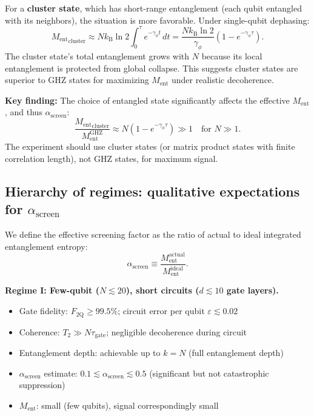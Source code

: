 \documentclass[12pt,letterpaper]{article}
\theoremstyle{plain}
\theoremstyle{definition}
\theoremstyle{remark}
\newcommand{\kB}{k_{\mathrm{B}}}
\newcommand{\Ment}{M_{\mathrm{ent}}}
\newcommand{\asc}{\alpha_{\mathrm{screen}}}
\begin{document}
For a \textbf{cluster state}, which has short-range entanglement (each qubit entangled with
its neighbors), the situation is more favorable.  Under single-qubit dephasing:
\begin{equation}
  {\Ment}_{\mathrm{cluster}}
  \approx N\kB\ln 2 \int_0^\tau e^{-\gamma_\phi t}\,dt
  = \frac{N\kB\ln 2}{\gamma_\phi}\left(1 - e^{-\gamma_\phi\tau}\right).
  \label{eq:Ment-cluster}
\end{equation}
The cluster state's total entanglement grows with $N$ because its local entanglement is
protected from global collapse.  This suggests cluster states are superior to GHZ states
for maximizing $\Ment$ under realistic decoherence.

\textbf{Key finding:} The choice of entangled state significantly affects the effective
$\Ment$, and thus $\asc$:
\begin{equation}
  \frac{{\Ment}_{\mathrm{cluster}}}{\Ment^{\mathrm{GHZ}}}
  \approx N\left(1 - e^{-\gamma_\phi\tau}\right)
  \gg 1 \quad \text{for } N \gg 1.
  \label{eq:ratio}
\end{equation}
The experiment should use cluster states (or matrix product states with finite correlation
length), not GHZ states, for maximum signal.

\subsection{Hierarchy of regimes: qualitative expectations for $\asc$}

We define the effective screening factor as the ratio of actual to ideal integrated
entanglement entropy:
\begin{equation}
  \asc \equiv \frac{\Ment^{\mathrm{actual}}}{\Ment^{\mathrm{ideal}}}.
  \label{eq:asc-def}
\end{equation}

\textbf{Regime I: Few-qubit ($N \lesssim 20$), short circuits ($d \lesssim 10$ gate layers).}
\begin{itemize}
  \item Gate fidelity: $F_{\mathrm{2Q}} \geq 99.5\%$; circuit error per qubit $\varepsilon \lesssim 0.02$
  \item Coherence: $T_2 \gg N\tau_{\mathrm{gate}}$; negligible decoherence during circuit
  \item Entanglement depth: achievable up to $k = N$ (full entanglement depth)
  \item $\asc$ estimate: $0.1 \lesssim \asc \lesssim 0.5$ (significant but not catastrophic suppression)
  \item $\Ment$: small (few qubits), signal correspondingly small
\end{itemize}
\end{document}
